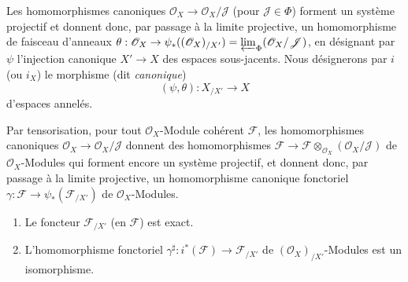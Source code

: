 \begin{env}[10.8.7]
\label{I.10.8.7-fr}
Les homomorphismes canoniques
$\mathscr{O}_X\to\mathscr{O}_X/\mathscr{J}$ (pour
$\mathscr{J}\in\Phi$) forment un système projectif et donnent donc, par
passage à la limite projective, un homomorphisme de faisceau d'anneaux
$\theta:\mathscr{O}_X\to\psi_*((\mathscr{O}_X)_{/X'})
=\varprojlim_\Phi(\mathscr{O}_X/\mathscr{J})$, en désignant par $\psi$
l'injection canonique $X'\to X$ des espaces sous-jacents. Nous désignerons
par $i$ (ou $i_X$) le morphisme (dit \emph{canonique})
\[
  (\psi,\theta):X_{/X'}\to X
\]
d'espaces annelés.

Par tensorisation, pour tout $\mathscr{O}_X$-Module cohérent
$\mathscr{F}$, les homomorphismes canoniques
$\mathscr{O}_X\to\mathscr{O}_X/\mathscr{J}$ donnent des homomorphismes
$\mathscr{F}\to
\mathscr{F}\otimes_{\mathscr{O}_X}(\mathscr{O}_X/\mathscr{J})$ de
$\mathscr{O}_X$-Modules qui forment encore un système projectif, et
donnent donc, par passage à la limite projective, un homomorphisme
canonique fonctoriel
$\gamma:\mathscr{F}\to\psi_*(\mathscr{F}_{/X'})$ de
$\mathscr{O}_X$-Modules.
\end{env}

\begin{proposition}[10.8.8]
\label{I.10.8.8-fr}
\medskip\noindent
\begin{enumerate}
  \item[\rm{(i)}] Le foncteur $\mathscr{F}_{/X'}$ (en $\mathscr{F}$) est
    exact.
  \item[\rm{(ii)}] L'homomorphisme fonctoriel
    $\gamma^\sharp:i^*(\mathscr{F})\to\mathscr{F}_{/X'}$ de
    $(\mathscr{O}_X)_{/X'}$-Modules est un isomorphisme.
\end{enumerate}
\end{proposition}

